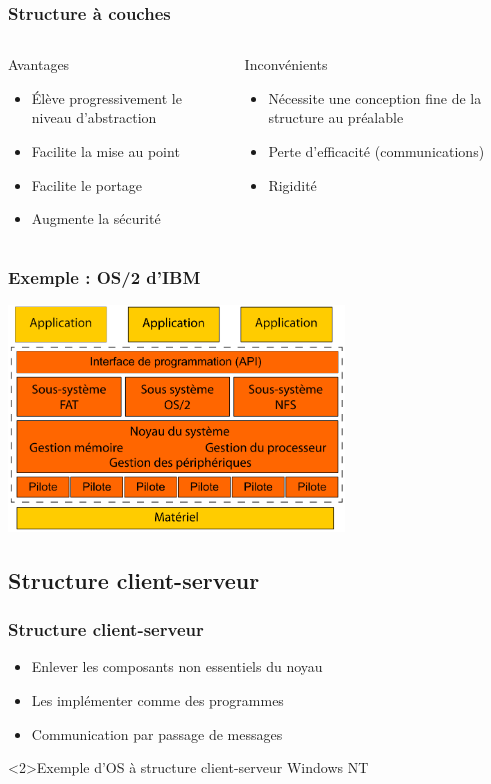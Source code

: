 \begin{frame}
\frametitle{Structure à couches}
\begin{columns}
\begin{block}{Avantages}
\begin{itemize}
\item Élève progressivement le niveau d’abstraction
\item Facilite la mise au point
\item Facilite le portage
\item Augmente la sécurité
\end{itemize}
\end{block}
\begin{block}{Inconvénients}
\begin{itemize}
\item Nécessite une conception fine de la structure au préalable
\item Perte d’efficacité (communications)
\item Rigidité
\end{itemize}
\end{block}
\end{columns}
\end{frame}

\begin{frame}
\frametitle{Exemple : OS/2 d'IBM}
\includegraphics[height=6cm]{../illustration/exemple_os2.pdf}
\end{frame}


\subsection{Structure client-serveur}

\begin{frame}
\frametitle{Structure client-serveur}
\begin{itemize}
\item Enlever les composants non essentiels du noyau
\item Les implémenter comme des programmes
\item Communication par passage de messages
\end{itemize}
\begin{exampleblock}<2>{Exemple d'OS à structure client-serveur}
Windows NT
\end{exampleblock}
\end{frame}


